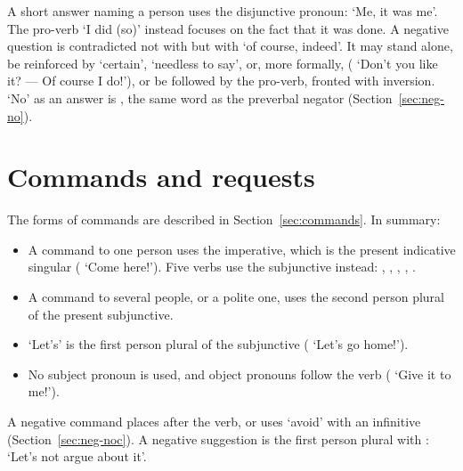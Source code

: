 A short answer naming a person uses the disjunctive pronoun:  `Me, it was me'. The pro-verb  `I did (so)' instead focuses on the fact that it was done.
A negative question is contradicted not with  but with  `of course, indeed'. It may stand alone, be reinforced by  `certain',  `needless to say',  or, more formally,  ( `Don't you like it? --- Of course I do!'), or be followed by the pro-verb, fronted with inversion.
`No' as an answer is , the same word as the preverbal negator (Section~\ref{sec:neg-no}).

\section{Commands and requests}\label{sec:commands-requests}
The forms of commands are described in Section~\ref{sec:commands}. In summary:
\begin{itemize}
    \item A command to one person uses the imperative, which is the present indicative singular ( `Come here!'). Five verbs use the subjunctive instead: , , , , .
    \item A command to several people, or a polite one, uses the second person plural of the present subjunctive.
    \item `Let's' is the first person plural of the subjunctive ( `Let's go home!').
    \item No subject pronoun is used, and object pronouns follow the verb ( `Give it to me!').
\end{itemize}
A negative command places  after the verb, or uses  `avoid' with an infinitive (Section~\ref{sec:neg-noc}). A negative suggestion is the first person plural with :  `Let's not argue about it'.

